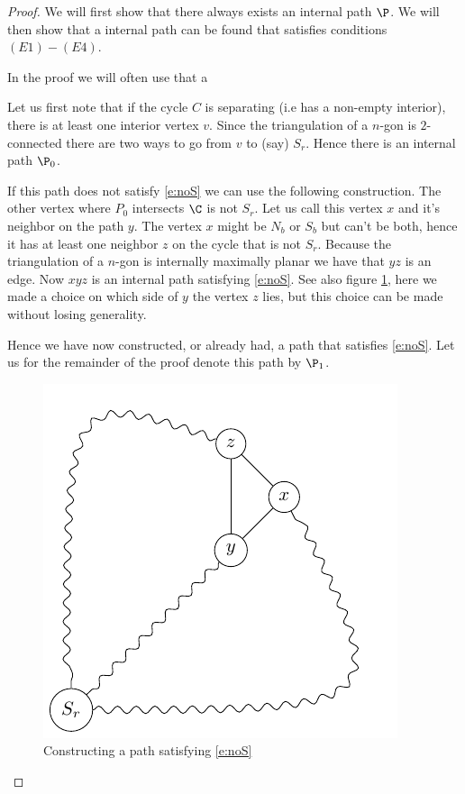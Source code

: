 \begin{proof}
We will first show that there always exists an internal path $\P$. We will then show that a internal path can be found that satisfies conditions $(E1) - (E4)$.

In the proof we will often use that a

Let us first note that if the cycle $C$ is separating (i.e has a non-empty interior), there is at least one interior vertex $v$. Since the triangulation of a $n$-gon is $2$-connected there are two ways to go from $v$ to (say) $S_r$. Hence there is an internal path $\P_0$.

If this path does not satisfy \ref{e:noS} we can use the following construction. The other vertex where $P_0$ intersects $\C$ is not $S_r$. Let us call this vertex $x$ and it's neighbor on the path $y$. The vertex $x$ might be $N_b$ or $S_b$ but can't be both, hence it has at least one neighbor $z$ on the cycle that is not $S_r$. Because the triangulation of a $n$-gon is internally maximally planar we have that $yz$ is an edge. Now $xyz$ is an internal path satisfying \ref{e:noS}. See also figure \ref{fig:E1}, here we made a choice on which side of $y$ the vertex $z$ lies, but this choice can be made without losing generality.

Hence we have now constructed, or already had, a path that satisfies \ref{e:noS}. Let us for the remainder of the proof denote this path by $\P_1$.


\begin{figure}[ht]
\centering
\includegraphics[]{algo/img/E1}
\caption{Constructing a path satisfying \ref{e:noS} \label{fig:E1}}
\end{figure}


\end{proof}
